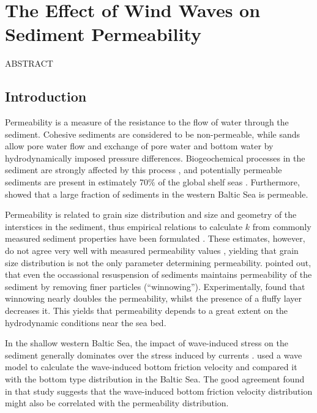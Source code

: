 \chapter{The Effect of Wind Waves on Sediment Permeability}
\label{kap-waves}

ABSTRACT

\section{Introduction}

Permeability is a measure of the resistance to the flow of water 
through the sediment. Cohesive sediments are considered to be non-permeable, 
while sands allow pore water flow and exchange of pore water and bottom water 
by hydrodynamically imposed pressure differences. 
Biogeochemical processes in the sediment are strongly affected by this process 
\citep[][]{huettel2003}, and potentially permeable sediments are present in 
estimately 70$\%$ of the global shelf seas \citep[][]{boudreau2001, 
forster2003}. Furthermore, \cite{forster2003} showed that a large fraction of 
sediments in the western Baltic Sea is permeable.

Permeability is related to grain size distribution and size and geometry of the 
interstices in the sediment, thus empirical relations to calculate $k$ from 
commonly measured sediment properties have been formulated 
\citep[e.g.][]{krumbein1942, carman1937}. These estimates, however, do not 
agree very well with measured permeability values \citep[][]{rusch2001}, 
yielding that grain size distribution is not the only parameter determining 
permeability. \cite{boudreau2001} pointed out, that even the occassional 
resuspension of sediments maintains permeability of the sediment by 
removing finer particles (``winnowing''). Experimentally, \cite{forster2003} 
found that winnowing nearly doubles the permeability, whilst the presence of a 
fluffy layer decreases it. This yields that permeability depends to a great 
extent on the hydrodynamic conditions near the sea bed. 

In the shallow western Baltic Sea, the impact of wave-induced stress on the 
sediment generally dominates over the stress induced by currents 
\citep[][]{Grant1986}. \cite{jonsson2004} used a wave model to calculate the 
wave-induced bottom friction velocity and compared it with the bottom type 
distribution in the Baltic Sea. The good agreement found in that study suggests 
that the wave-induced bottom friction velocity distribution might also be 
correlated with the permeability distribution.

